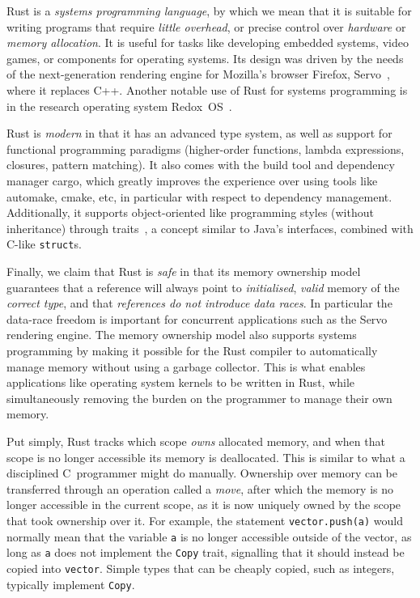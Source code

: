 \documentclass[11pt,a4paper,twoside,openany]{report}
\newcommand{\InRust}[1]{\texttt{#1}}
\renewcommand\_{\textunderscore\allowbreak}
\begin{document}
Rust is a \textit{systems programming language}, by which we mean that it is
suitable for writing programs that require \textit{little overhead}, or precise
control over \textit{hardware} or \textit{memory allocation}. It is useful for
tasks like developing embedded systems, video games, or components for operating
systems. Its design was driven by the needs of the next-generation rendering
engine for Mozilla's browser Firefox, Servo~\cite{anderson2016engineering},
where it replaces C++. Another notable use of Rust for systems programming is in
the research operating system Redox~OS~\cite{redox}.

Rust is \textit{modern} in that it has an advanced type system, as well as
support for functional programming paradigms (higher-order functions, lambda
expressions, closures, pattern matching). It also comes with the build tool and
dependency manager cargo, which greatly improves the experience over using tools
like automake, cmake, etc, in particular with respect to dependency management.
Additionally, it supports object-oriented like programming styles (without
inheritance) through traits~\cite{scharli2003traits}, a concept similar to
Java's interfaces, combined with C-like \InRust{struct}s.

Finally, we claim that Rust is \textit{safe} in that its memory ownership model
guarantees that a reference will always point to \textit{initialised},
\textit{valid} memory of the \textit{correct type}, and that \textit{references
  do not introduce data races}. In particular the data-race freedom is important
for concurrent applications such as the Servo rendering engine. The memory
ownership model also supports systems programming by making it possible for the
Rust compiler to automatically manage memory without using a garbage collector.
This is what enables applications like operating system kernels to be written in
Rust, while simultaneously removing the burden on the programmer to manage their
own memory.

Put simply, Rust tracks which scope \textit{owns} allocated memory, and when
that scope is no longer accessible its memory is deallocated. This is similar
to what a disciplined C~programmer might do manually. Ownership over memory can
be transferred through an operation called a \textit{move}, after which the
memory is no longer accessible in the current scope, as it is now uniquely owned
by the scope that took ownership over it. For example, the statement
\InRust{vector.push(a)} would normally mean that the variable \InRust{a} is no
longer accessible outside of the vector, as long as \InRust{a} does not
implement the \InRust{Copy} trait, signalling that it should instead be copied
into \InRust{vector}. Simple types that can be cheaply copied, such as integers,
typically implement \InRust{Copy}.
\end{document}
